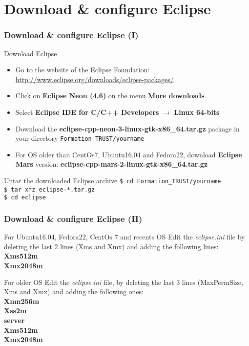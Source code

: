 \documentclass[10pt, hyperref={unicode=true,pdfusetitle, bookmarks=true,bookmarksnumbered=false,bookmarksopen=false, breaklinks=false,pdfborder={0 0 1},backref=true,colorlinks=true,linkcolor=darkblue,pageanchor, urlcolor=darkblue}]{beamer}
\begin{document}
\section{{\bf{Download \& configure Eclipse}}}
\begin{frame}
\frametitle{Download \& configure Eclipse (I)}

\begin{block}{Download Eclipse}
\begin{itemize}
\item Go to the website of the Eclipse Foundation: \url{http://www.eclipse.org/downloads/eclipse-packages/}
\item Click on \textbf{Eclipse Neon (4.6)} on the menu \textbf{More downloads}.
\item Select \textbf{Eclipse IDE for C/C++ Developers} $\rightarrow$ \textbf{Linux 64-bits}
\item Download the \textbf{eclipse-cpp-neon-3-linux-gtk-x86\_64.tar.gz} package in your directory \texttt{Formation\_TRUST/yourname}
\item For OS older than CentOs7, Ubuntu16.04 and Fedora22, download \textbf{Eclipse Mars} version: \textbf{eclipse-cpp-mars-2-linux-gtk-x86\_64.tar.gz}
\end{itemize}
\end{block}

\begin{block}{Untar the downloaded Eclipse archive}
 \texttt{\$ cd Formation\_TRUST/yourname} \\
 \texttt{\$ tar xfz eclipse-*.tar.gz} \\
 \texttt{\$ cd eclipse}
\end{block}

\end{frame}
\begin{frame}
\frametitle{Download \& configure Eclipse (II)}

\begin{block}{For Ubuntu16.04, Fedora22, CentOs 7 and recents OS}
Edit the \textit{eclipse.ini} file by deleting the last 2 lines (Xms and Xmx) and adding the following lines:\\
\textbf{Xms512m} \\
\textbf{Xmx2048m}
\end{block}

\begin{block}{For older OS}
Edit the \textit{eclipse.ini} file, by deleting the last 3 lines (MaxPermSize, Xms and Xmx) and adding the following ones: \\
\textbf{Xmn256m} \\
\textbf{Xss2m}\\
\textbf{server}\\
\textbf{Xms512m}\\
\textbf{Xmx2048m}
\end{block}

\end{frame}
\end{document}
